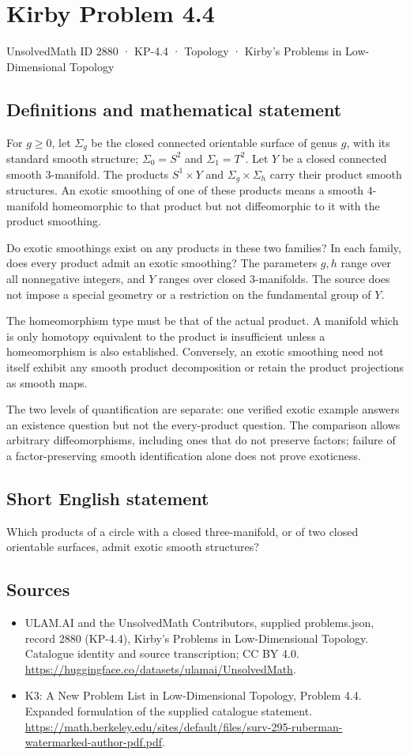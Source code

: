 \documentclass[11pt,a4paper]{article}
\begin{document}
\section*{Kirby Problem 4.4}\label{2880}
{\small UnsolvedMath ID 2880 · KP-4.4 · Topology · Kirby's Problems in Low-Dimensional Topology}
\subsection{Definitions and mathematical statement}
For $g\ge0$, let $\Sigma_g$ be the closed connected orientable surface
of genus $g$, with its standard smooth structure; $\Sigma_0=S^2$ and
$\Sigma_1=T^2$. Let $Y$ be a closed connected smooth $3$-manifold.
The products $S^1\times Y$ and $\Sigma_g\times\Sigma_h$ carry their
product smooth structures. An exotic smoothing of one of these products
means a smooth $4$-manifold homeomorphic to that product but not
diffeomorphic to it with the product smoothing.

Do exotic smoothings exist on any products in these two families?
In each family, does every product admit an exotic smoothing? The
parameters $g,h$ range over all nonnegative integers, and $Y$ ranges
over closed $3$-manifolds. The source does not impose a special geometry
or a restriction on the fundamental group of $Y$.

The homeomorphism type must be that of the actual product. A manifold
which is only homotopy equivalent to the product is insufficient unless
a homeomorphism is also established. Conversely, an exotic smoothing
need not itself exhibit any smooth product decomposition or retain
the product projections as smooth maps.

The two levels of quantification are separate: one verified exotic
example answers an existence question but not the every-product
question. The comparison allows arbitrary diffeomorphisms, including
ones that do not preserve factors; failure of a factor-preserving
smooth identification alone does not prove exoticness.
\subsection{Short English statement}
Which products of a circle with a closed three-manifold, or of two closed orientable surfaces, admit exotic smooth structures?
\subsection{Sources}
\begin{itemize}
\item[S1] ULAM.AI and the UnsolvedMath Contributors, supplied problems.json, record 2880 (KP-4.4), Kirby's Problems in Low-Dimensional Topology. Catalogue identity and source transcription; CC BY 4.0.
\url{https://huggingface.co/datasets/ulamai/UnsolvedMath}.
\item[S2] K3: A New Problem List in Low-Dimensional Topology, Problem 4.4. Expanded formulation of the supplied catalogue statement.
\url{https://math.berkeley.edu/sites/default/files/surv-295-ruberman-watermarked-author-pdf.pdf}.
\end{itemize}
\end{document}
